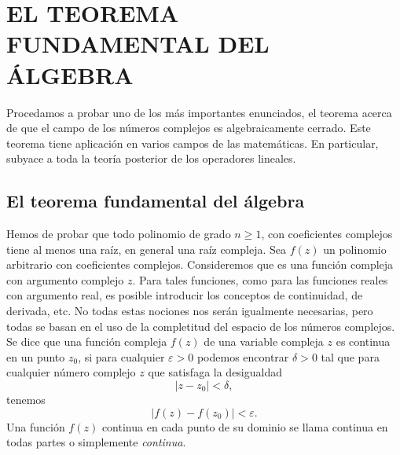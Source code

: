 \chapter[EL TEOREMA FUNDAMENTAL DEL ÁLGEBRA]{EL TEOREMA \\ FUNDAMENTAL DEL \\ ÁLGEBRA} \label{FUNDAMENTAL}

Procedamos a probar uno de los más importantes enunciados, el teorema acerca de que el campo de los números complejos es algebraicamente cerrado. Este teorema tiene aplicación en varios campos de las matemáticas. En particular, subyace a toda la teoría posterior de los operadores lineales.

\section{El teorema fundamental del álgebra}

Hemos de probar que todo polinomio de grado $n \geq 1$, con coeficientes complejos tiene al menos una raíz, en general una raíz compleja. Sea $f(z)$ un polinomio arbitrario con coeficientes complejos. Consideremos que es una función compleja con argumento complejo $z$. Para tales funciones, como para las funciones reales con argumento real, es posible introducir los conceptos de continuidad, de derivada, etc. No todas estas nociones nos serán igualmente necesarias, pero todas se basan en el uso de la completitud del espacio de los números complejos. Se dice que una función compleja $f(z)$ de una variable compleja $z$ es continua en un punto $z_0$, si para cualquier $\varepsilon >0$ podemos encontrar $\delta >0$ tal que para cualquier número complejo $z$ que satisfaga la desigualdad
$$|z - z_0| < \delta,$$
tenemos
$$|f(z) - f(z_0)| < \varepsilon.$$\newpage\noindent
Una función $f(z)$ continua en cada punto de su dominio se llama continua en todas partes o simplemente \emph{continua}.

